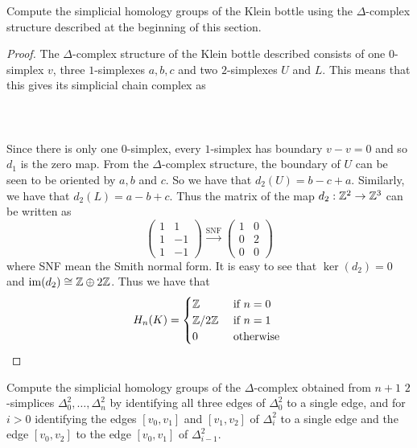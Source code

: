 \documentclass[a4paper]{article}
\begin{document}
\begin{ex}{}{} Compute the simplicial homology groups of the Klein bottle using the $\Delta$-complex structure described at the beginning of this section. \tcbline
\begin{proof}
The $\Delta$-complex structure of the Klein bottle described consists of one $0$-simplex $v$, three $1$-simplexes $a,b,c$ and two $2$-simplexes $U$ and $L$. This means that this gives its simplicial chain complex as \\~\\
\\~\\
Since there is only one $0$-simplex, every $1$-simplex has boundary $v-v=0$ and so $d_1$ is the zero map. From the $\Delta$-complex structure, the boundary of $U$ can be seen to be oriented by $a,b$ and $c$. So we have that $d_2(U)=b-c+a$. Similarly, we have that $d_2(L)=a-b+c$. Thus the matrix of the map $d_2:\mathbb{Z}^2\to\mathbb{Z}^3$ can be written as $$\begin{pmatrix}
1 & 1\\
1 & -1\\
1 & -1
\end{pmatrix}\overset{\text{SNF}}{\longrightarrow}\begin{pmatrix}
1 & 0\\
0 & 2\\
0 & 0
\end{pmatrix}$$ where SNF mean the Smith normal form. It is easy to see that $\ker(d_2)=0$ and $\operatorname{im}(d_2)\cong \mathbb{Z}\oplus 2\mathbb{Z}$. Thus we have that $$H_n(K)=\begin{cases}
\mathbb{Z} & \text{ if } n=0\\
\mathbb{Z}/2\mathbb{Z} & \text{ if } n=1\\
0 & \text{ otherwise }
\end{cases}$$
\end{proof}
\end{ex}

\begin{ex}{}{} Compute the simplicial homology groups of the $\Delta$-complex obtained from $n+1$ $2$-simplices $\Delta_0^2,\dots,\Delta_n^2$ by identifying all three edges of $\Delta_0^2$ to a single edge, and for $i>0$ identifying the edges $[v_0,v_1]$ and $[v_1,v_2]$ of $\Delta_i^2$ to a single edge and the edge $[v_0,v_2]$ to the edge $[v_0,v_1]$ of $\Delta_{i-1}^2$. 
\end{ex}
\end{document}
